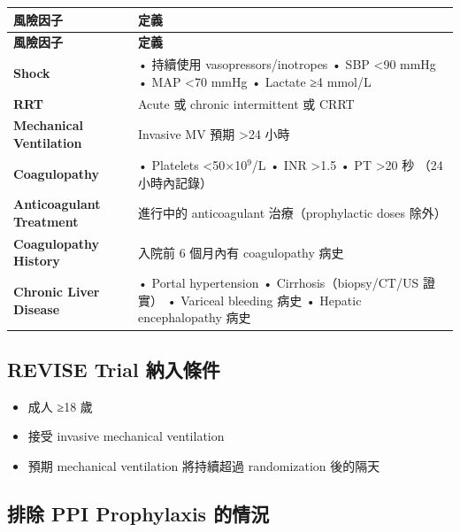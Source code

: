 \documentclass[12pt,a4paper]{article}
\begin{document}
\begin{longtable}{p{4cm}p{10cm}}
\toprule
\textbf{風險因子} & \textbf{定義} \\
\midrule
\endfirsthead

\toprule
\textbf{風險因子} & \textbf{定義} \\
\midrule
\endhead

\bottomrule
\endfoot

\textbf{Shock} &
• 持續使用 vasopressors/inotropes\newline
• SBP <90 mmHg\newline
• MAP <70 mmHg\newline
• Lactate ≥4 mmol/L \\
\midrule
\textbf{RRT} & Acute 或 chronic intermittent 或 CRRT \\
\midrule
\textbf{Mechanical Ventilation} & Invasive MV 預期 >24 小時 \\
\midrule
\textbf{Coagulopathy} &
• Platelets <50×10$^9$/L\newline
• INR >1.5\newline
• PT >20 秒\newline
（24 小時內記錄）\\
\midrule
\textbf{Anticoagulant Treatment} & 進行中的 anticoagulant 治療（prophylactic doses 除外）\\
\midrule
\textbf{Coagulopathy History} & 入院前 6 個月內有 coagulopathy 病史 \\
\midrule
\textbf{Chronic Liver Disease} &
• Portal hypertension\newline
• Cirrhosis（biopsy/CT/US 證實）\newline
• Variceal bleeding 病史\newline
• Hepatic encephalopathy 病史 \\
\bottomrule
\end{longtable}

\subsection{REVISE Trial 納入條件}

\begin{itemize}
    \item 成人 ≥18 歲
    \item 接受 invasive mechanical ventilation
    \item 預期 mechanical ventilation 將持續超過 randomization 後的隔天
\end{itemize}

\subsection{排除 PPI Prophylaxis 的情況}
\end{document}
